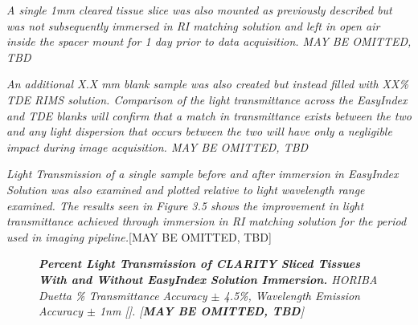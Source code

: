 \textit{A single 1mm cleared tissue slice was also mounted as previously described but was not subsequently immersed in RI matching solution and left in open air inside the spacer mount for 1 day prior to data acquisition. MAY BE OMITTED, TBD}

\textit{An additional X.X mm blank sample was also created but instead filled with XX\% TDE RIMS solution. Comparison of the light transmittance across the EasyIndex and TDE blanks will confirm that a match in transmittance exists between the two and any light dispersion that occurs between the two will have only a negligible impact during image acquisition. MAY BE OMITTED, TBD}

    
\textit{Light Transmission of a single sample before and after immersion in EasyIndex Solution was also examined and plotted relative to light wavelength range examined. The results seen in Figure 3.5 shows the improvement in light transmittance achieved through immersion in RI matching solution for the period used in imaging pipeline.}[MAY BE OMITTED, TBD]
\begin{figure}[H]
    \centering
    \caption{\textit{\textbf{Percent Light Transmission of CLARITY Sliced Tissues With and Without EasyIndex Solution Immersion.} HORIBA Duetta \% Transmittance Accuracy $\pm$ 4.5\%, Wavelength Emission Accuracy $\pm$ 1nm []. [\textbf{MAY BE OMITTED, TBD}]}}
    \label{fig:enter-label}
\end{figure}


